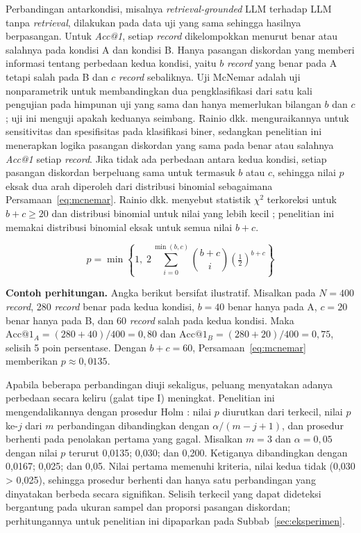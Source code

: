 Perbandingan antarkondisi, misalnya \textit{retrieval-grounded} LLM terhadap LLM tanpa \textit{retrieval}, dilakukan pada data uji yang sama sehingga hasilnya berpasangan. Untuk \textit{Acc@1}, setiap \textit{record} dikelompokkan menurut benar atau salahnya pada kondisi A dan kondisi B. Hanya pasangan diskordan yang memberi informasi tentang perbedaan kedua kondisi, yaitu $b$ \textit{record} yang benar pada A tetapi salah pada B dan $c$ \textit{record} sebaliknya. Uji McNemar \cite{rainio2024evaluation} adalah uji nonparametrik untuk membandingkan dua pengklasifikasi dari satu kali pengujian pada himpunan uji yang sama dan hanya memerlukan bilangan $b$ dan $c$; uji ini menguji apakah keduanya seimbang. Rainio dkk. menguraikannya untuk sensitivitas dan spesifisitas pada klasifikasi biner, sedangkan penelitian ini menerapkan logika pasangan diskordan yang sama pada benar atau salahnya \textit{Acc@1} setiap \textit{record}. Jika tidak ada perbedaan antara kedua kondisi, setiap pasangan diskordan berpeluang sama untuk termasuk $b$ atau $c$, sehingga nilai $p$ eksak dua arah diperoleh dari distribusi binomial sebagaimana Persamaan~\eqref{eq:mcnemar}. Rainio dkk. menyebut statistik $\chi^2$ terkoreksi untuk $b + c \geq 20$ dan distribusi binomial untuk nilai yang lebih kecil \cite{rainio2024evaluation}; penelitian ini memakai distribusi binomial eksak untuk semua nilai $b + c$.

\begin{equation}
  p = \min\left\{1,\; 2\sum_{i=0}^{\min(b,c)} \binom{b+c}{i} \left(\tfrac{1}{2}\right)^{b+c}\right\}
  \label{eq:mcnemar}
\end{equation}

\noindent\textbf{Contoh perhitungan.} Angka berikut bersifat ilustratif. Misalkan pada $N = 400$ \textit{record}, 280 \textit{record} benar pada kedua kondisi, $b = 40$ benar hanya pada A, $c = 20$ benar hanya pada B, dan 60 \textit{record} salah pada kedua kondisi. Maka $\text{Acc@}1_A = (280 + 40)/400 = 0{,}80$ dan $\text{Acc@}1_B = (280 + 20)/400 = 0{,}75$, selisih 5 poin persentase. Dengan $b + c = 60$, Persamaan~\eqref{eq:mcnemar} memberikan $p \approx 0{,}0135$.

Apabila beberapa perbandingan diuji sekaligus, peluang menyatakan adanya perbedaan secara keliru (galat tipe I) meningkat. Penelitian ini mengendalikannya dengan prosedur Holm \cite{menyhart2021multipletesting}: nilai $p$ diurutkan dari terkecil, nilai $p$ ke-$j$ dari $m$ perbandingan dibandingkan dengan $\alpha/(m - j + 1)$, dan prosedur berhenti pada penolakan pertama yang gagal. Misalkan $m = 3$ dan $\alpha = 0{,}05$ dengan nilai $p$ terurut 0,0135; 0,030; dan 0,200. Ketiganya dibandingkan dengan 0,0167; 0,025; dan 0,05. Nilai pertama memenuhi kriteria, nilai kedua tidak (0,030 > 0,025), sehingga prosedur berhenti dan hanya satu perbandingan yang dinyatakan berbeda secara signifikan. Selisih terkecil yang dapat dideteksi bergantung pada ukuran sampel dan proporsi pasangan diskordan; perhitungannya untuk penelitian ini dipaparkan pada Subbab~\ref{sec:eksperimen}.

